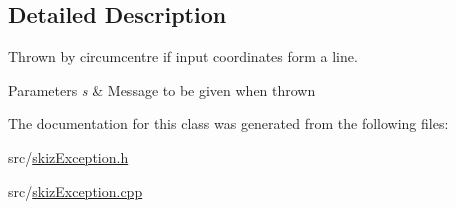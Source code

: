 \subsection{Detailed Description}
Thrown by circumcentre if input coordinates form a line. 


\begin{DoxyParams}{Parameters}
{\em s} & Message to be given when thrown \\
\hline
\end{DoxyParams}


The documentation for this class was generated from the following files\+:\begin{DoxyCompactItemize}
\item 
src/\mbox{\hyperlink{skizException_8h}{skiz\+Exception.\+h}}\item 
src/\mbox{\hyperlink{skizException_8cpp}{skiz\+Exception.\+cpp}}\end{DoxyCompactItemize}
